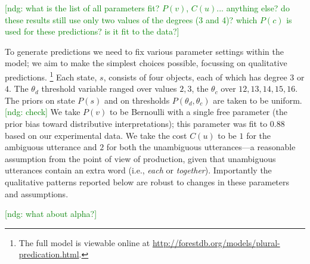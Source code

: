 \documentclass[linguex]{sp}
\newcommand{\ndg}[1]{\textcolor{Green}{[ndg: #1]}}
\begin{document}
\ndg{what is the list of all parameters fit? $P(v)$, $C(u)$... anything else? do these results still use only two values of the degrees (3 and 4)? which $P(c)$ is used for these predictions? is it fit to the data?}


To generate predictions we need to fix various parameter settings within the model; we aim to make the simplest choices possible, focussing on qualitative predictions. \footnote{The full model is viewable online at \url{http://forestdb.org/models/plural-predication.html}.}
Each state, $s$, consists of four objects, each of which has degree $3$ or $4$. 
The $\theta_d$ threshold variable ranged over values $2,3$, the $\theta_c$ over $12,13,14,15,16$.
The priors on state $P(s)$ and on thresholds $P(\theta_d,\theta_c)$ are taken to be uniform. \ndg{check}
We take $P(v)$ to be Bernoulli with a single free parameter (the prior bias toward distributive interpretations); this parameter was fit to $0.88$ based on our experimental data.
We take the cost $C(u)$ to be $1$ for the ambiguous utterance and $2$ for both the unambiguous utterances---a reasonable assumption from the point of view of production, given that unambiguous utterances contain an extra word (i.e., \emph{each} or \emph{together}).
Importantly the qualitative patterns reported below are robust to changes in these parameters and assumptions.

\ndg{what about alpha?}

\end{document}
